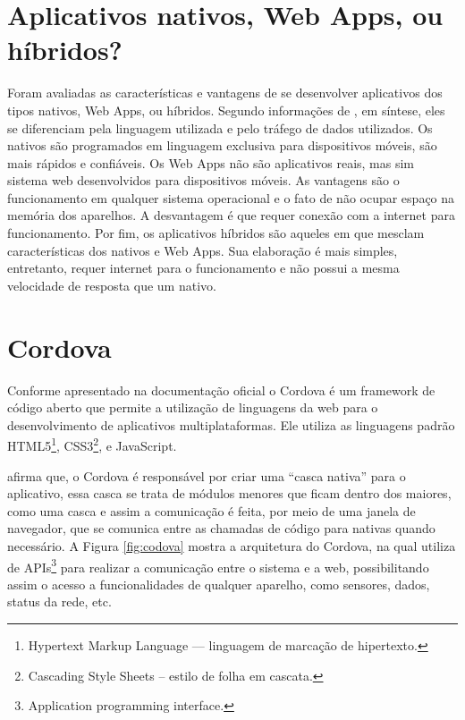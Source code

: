     
\section{Aplicativos nativos, Web Apps, ou híbridos?}    
    Foram avaliadas as características e vantagens de se desenvolver aplicativos dos tipos nativos, Web Apps, ou híbridos. Segundo informações de , em síntese, eles se diferenciam pela linguagem utilizada e pelo tráfego de dados utilizados. Os nativos são programados em linguagem exclusiva para dispositivos móveis, são mais rápidos e confiáveis. Os Web Apps não são aplicativos reais, mas sim sistema web desenvolvidos para dispositivos móveis. As vantagens são o funcionamento em qualquer sistema operacional e o fato de não ocupar espaço na memória dos aparelhos. A desvantagem é que requer conexão com a internet para funcionamento. Por fim, os aplicativos híbridos são aqueles em que mesclam características dos nativos e Web Apps. Sua elaboração é mais simples, entretanto, requer internet para o funcionamento e não possui a mesma velocidade de resposta que um nativo.
    
\section{Cordova}
    Conforme apresentado na documentação oficial  o Cordova é um framework de código aberto que permite a utilização de linguagens da web para o desenvolvimento de aplicativos multiplataformas. Ele utiliza as linguagens padrão HTML5\footnote{Hypertext Markup Language — linguagem de marcação de hipertexto.}, CSS3\footnote{Cascading Style Sheets – estilo de folha em cascata.}, e JavaScript.

     afirma que, o Cordova é responsável por criar uma “casca nativa” para o aplicativo, essa casca se trata de módulos menores que ficam dentro dos maiores, como uma casca e assim a comunicação é feita, por meio de uma janela de navegador, que se comunica entre as chamadas de código para nativas quando necessário. A Figura \ref{fig:codova} mostra a arquitetura do Cordova, na qual utiliza de APIs\footnote{Application programming interface.} para realizar a comunicação entre o sistema e a web, possibilitando assim o acesso a funcionalidades de qualquer aparelho, como sensores, dados, status da rede, etc.


